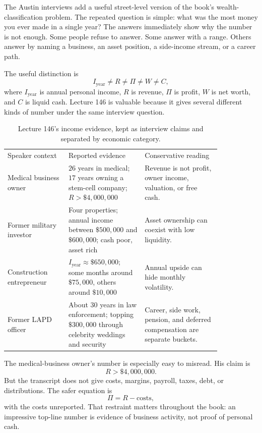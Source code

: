 \documentclass[11pt,oneside]{book}
\begin{document}
The Austin interviews add a useful street-level version of the book's wealth-classification problem. The repeated question is simple: what was the most money you ever made in a single year? The answers immediately show why the number is not enough. Some people refuse to answer. Some answer with a range. Others answer by naming a business, an asset position, a side-income stream, or a career path.

The useful distinction is
\[
I_{\mathrm{year}} \neq R \neq \Pi \neq W \neq C,
\]
where \(I_{\mathrm{year}}\) is annual personal income, \(R\) is revenue, \(\Pi\) is profit, \(W\) is net worth, and \(C\) is liquid cash. Lecture 146 is valuable because it gives several different kinds of number under the same interview question.

\begin{table}
\centering
\small
\begin{tabular}{p{0.24\linewidth} p{0.30\linewidth} p{0.30\linewidth}}
Speaker context & Reported evidence & Conservative reading \\
Medical business owner & \(26\) years in medical; \(17\) years owning a stem-cell company; \(R>\$4{,}000{,}000\) & Revenue is not profit, owner income, valuation, or free cash. \\
Former military investor & Four properties; annual income between \(\$500{,}000\) and \(\$600{,}000\); cash poor, asset rich & Asset ownership can coexist with low liquidity. \\
Construction entrepreneur & \(I_{\mathrm{year}}\approx \$650{,}000\); some months around \(\$75{,}000\), others around \(\$10{,}000\) & Annual upside can hide monthly volatility. \\
Former LAPD officer & About \(30\) years in law enforcement; topping \(\$300{,}000\) through celebrity weddings and security & Career, side work, pension, and deferred compensation are separate buckets. \\
\end{tabular}
\caption{Lecture 146's income evidence, kept as interview claims and separated by economic category.}
\end{table}

The medical-business owner's number is especially easy to misread. His claim is
\[
R>\$4{,}000{,}000.
\]
But the transcript does not give costs, margins, payroll, taxes, debt, or distributions. The safer equation is
\[
\Pi = R-\text{costs},
\]
with the costs unreported. That restraint matters throughout the book: an impressive top-line number is evidence of business activity, not proof of personal cash.
\end{document}
